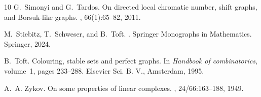 \documentclass{article}
\begin{document}
\begin{thebibliography}{10}
G.~Simonyi and G.~Tardos.
\newblock On directed local chromatic number, shift graphs, and {B}orsuk-like
  graphs.
, 66(1):65--82, 2011.

M.~Stiebitz, T.~Schweser, and B.~Toft.
.
\newblock Springer Monographs in Mathematics. Springer, 2024.

B.~Toft.
\newblock Colouring, stable sets and perfect graphs.
\newblock In {\em Handbook of combinatorics}, volume~1, pages 233--288.
  Elsevier Sci. B. V., Amsterdam, 1995.

A.~A. Zykov.
\newblock On some properties of linear complexes.
, 24/66:163--188, 1949.

\end{thebibliography}
\end{document}
